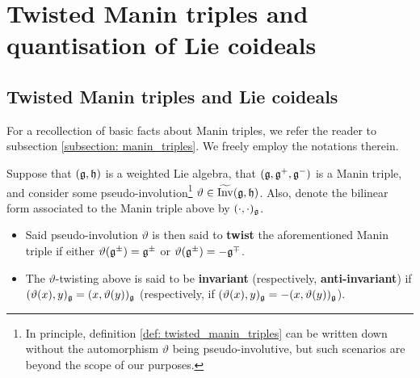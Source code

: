 \section{Twisted Manin triples and quantisation of Lie coideals}
    \subsection{Twisted Manin triples and Lie coideals}
        For a recollection of basic facts about Manin triples, we refer the reader to subsection \ref{subsection: manin_triples}. We freely employ the notations therein.
    
        \begin{definition} \label{def: twisted_manin_triples}
            Suppose that $(\mathfrak{g}, \mathfrak{h})$ is a weighted Lie algebra, that $(\mathfrak{g}, \mathfrak{g}^+, \mathfrak{g}^-)$ is a Manin triple, and consider some pseudo-involution\footnote{In principle, definition \ref{def: twisted_manin_triples} can be written down without the automorphism $\vartheta$ being pseudo-involutive, but such scenarios are beyond the scope of our purposes.} $\vartheta \in \widetilde{\operatorname{Inv}}(\mathfrak{g}, \mathfrak{h})$. Also, denote the bilinear form associated to the Manin triple above by $(\cdot, \cdot)_{\mathfrak{g}}$.
            \begin{itemize}
                \item Said pseudo-involution $\vartheta$ is then said to \textbf{twist} the aforementioned Manin triple if either $\vartheta(\mathfrak{g}^{\pm}) = \mathfrak{g}^{\pm}$ or $\vartheta(\mathfrak{g}^{\pm}) = -\mathfrak{g}^{\mp}$.
                \item The $\vartheta$-twisting above is said to be \textbf{invariant} (respectively, \textbf{anti-invariant}) if $( \vartheta(x), y )_{\mathfrak{g}} = ( x, \vartheta(y) )_{\mathfrak{g}}$ (respectively, if $( \vartheta(x), y )_{\mathfrak{g}} = -( x, \vartheta(y) )_{\mathfrak{g}}$).
            \end{itemize}
        \end{definition}

